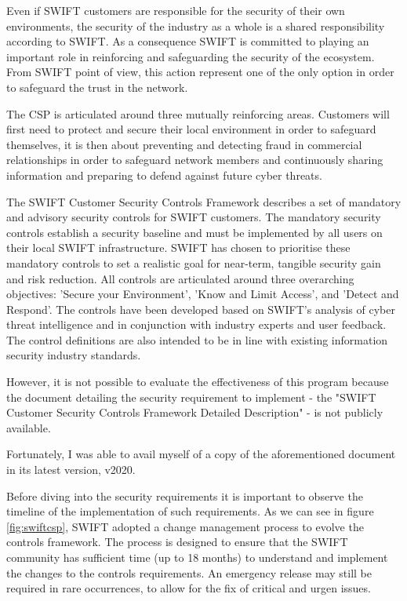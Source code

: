 \documentclass[12pt]{article}
\begin{document}
        Even if SWIFT customers are responsible for the security of their own environments, the security of the industry as a whole is a shared responsibility according to SWIFT. As a consequence SWIFT is committed to playing an important role in reinforcing and safeguarding the security of the ecosystem. From SWIFT point of view, this action represent one of the only option in order to safeguard the trust in the network. 
        
        The CSP is articulated around three mutually reinforcing areas. Customers will first need to protect and secure their local environment in order to safeguard themselves, it is then about preventing and detecting fraud in commercial relationships in order to safeguard network members and continuously sharing information and preparing to defend against future cyber threats.
        
        The SWIFT Customer Security Controls Framework describes a set of mandatory and advisory security controls for SWIFT customers. The mandatory security controls establish a security baseline and must be implemented by all users on their local SWIFT infrastructure. SWIFT has chosen to prioritise these mandatory controls to set a realistic goal for near-term, tangible security gain and risk reduction. 
        All controls are articulated around three overarching objectives: 'Secure your Environment', 'Know and Limit Access', and 'Detect and Respond'. The controls have been developed based on SWIFT's analysis of cyber threat intelligence and in conjunction with industry experts and user feedback. The control definitions are also intended to be in line with existing information security industry standards.
        
        However, it is not possible to evaluate the effectiveness of this program because the document detailing the security requirement to implement - the "SWIFT Customer Security Controls Framework Detailed Description" - is not publicly available. 
        
        Fortunately, I was able to avail myself of a copy of the aforementioned document in its latest version, v2020.
        
        Before diving into the security requirements it is important to observe the timeline of the implementation of such requirements. As we can see in figure \ref{fig:swiftcsp}, SWIFT adopted a change management process to evolve the controls framework. The process is designed to ensure that the SWIFT community has sufficient time (up to 18 months) to understand and implement the changes to the controls requirements. An emergency release may still be required in rare occurrences, to allow for the fix of critical and urgen issues. 
        
\end{document}
